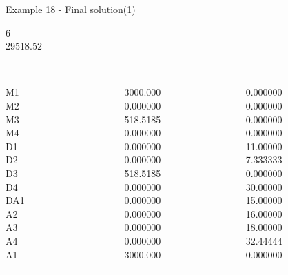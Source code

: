 \begin{frame}{Example 18 - Final solution(1)}

 6 \\
  29518.52\\

\begin{columns}[t]
\begin{column}{0.3\textwidth}
\\
M1\\
M2\\
M3\\
M4\\
D1\\
D2\\
D3\\
D4\\
DA1\\
A2\\
A3\\
A4\\
A1\\
-----------\\

\end{column}
\begin{column}{0.3\textwidth}
\\
3000.000\\
0.000000\\
518.5185\\
0.000000\\
0.000000\\
0.000000\\
518.5185\\
0.000000\\
0.000000\\
0.000000\\
0.000000\\
0.000000\\
3000.000\\
\end{column}  

\begin{column}{0.3\textwidth}
\\
0.000000\\
0.000000\\
0.000000\\
0.000000\\
11.00000\\
7.333333\\
0.000000\\
30.00000\\
15.00000\\
16.00000\\
18.00000\\
32.44444\\
0.000000\\
\end{column}
\end{columns}
\end{frame}

